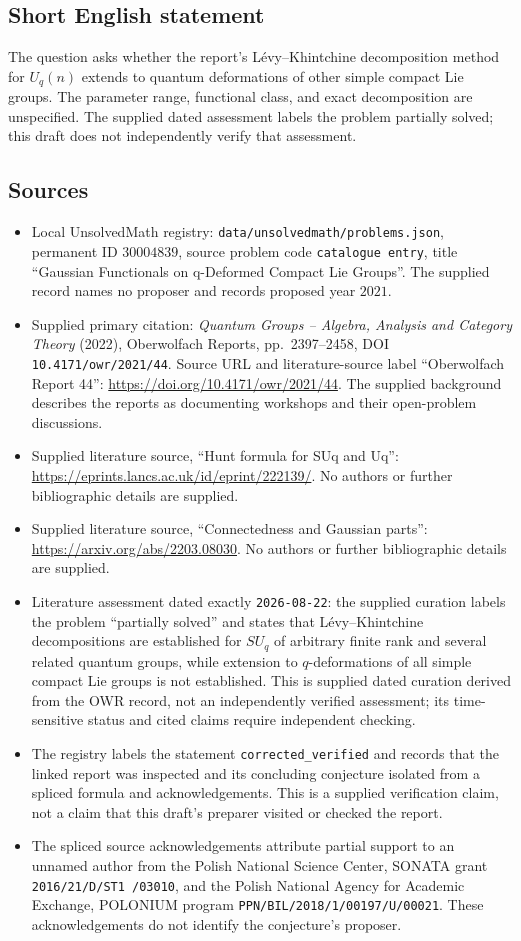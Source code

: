 \documentclass[11pt]{article}
\begin{document}
\subsection{Short English statement}
The question asks whether the report's L\'evy--Khintchine decomposition method for \(U_q(n)\) extends to quantum deformations of other simple compact Lie groups. The parameter range, functional class, and exact decomposition are unspecified. The supplied dated assessment labels the problem partially solved; this draft does not independently verify that assessment.
\subsection{Sources}
\begin{itemize}
\item Local UnsolvedMath registry: \texttt{data/unsolvedmath/problems.json}, permanent ID \(30004839\), source problem code \texttt{catalogue entry}, title ``Gaussian Functionals on q-Deformed Compact Lie Groups''. The supplied record names no proposer and records proposed year \(2021\).
\item Supplied primary citation: \emph{Quantum Groups -- Algebra, Analysis and Category Theory} (2022), Oberwolfach Reports, pp.\ 2397--2458, DOI \texttt{10.4171/owr/2021/44}. Source URL and literature-source label ``Oberwolfach Report 44'': \url{https://doi.org/10.4171/owr/2021/44}. The supplied background describes the reports as documenting workshops and their open-problem discussions.
\item Supplied literature source, ``Hunt formula for SUq and Uq'': \url{https://eprints.lancs.ac.uk/id/eprint/222139/}. No authors or further bibliographic details are supplied.
\item Supplied literature source, ``Connectedness and Gaussian parts'': \url{https://arxiv.org/abs/2203.08030}. No authors or further bibliographic details are supplied.
\item Literature assessment dated exactly \texttt{2026-08-22}: the supplied curation labels the problem ``partially solved'' and states that L\'evy--Khintchine decompositions are established for \(SU_q\) of arbitrary finite rank and several related quantum groups, while extension to \(q\)-deformations of all simple compact Lie groups is not established. This is supplied dated curation derived from the OWR record, not an independently verified assessment; its time-sensitive status and cited claims require independent checking.
\item The registry labels the statement \texttt{corrected\_verified} and records that the linked report was inspected and its concluding conjecture isolated from a spliced formula and acknowledgements. This is a supplied verification claim, not a claim that this draft's preparer visited or checked the report.
\item The spliced source acknowledgements attribute partial support to an unnamed author from the Polish National Science Center, SONATA grant \texttt{2016/21/D/ST1 /03010}, and the Polish National Agency for Academic Exchange, POLONIUM program \texttt{PPN/BIL/2018/1/00197/U/00021}. These acknowledgements do not identify the conjecture's proposer.
\end{itemize}
\end{document}
